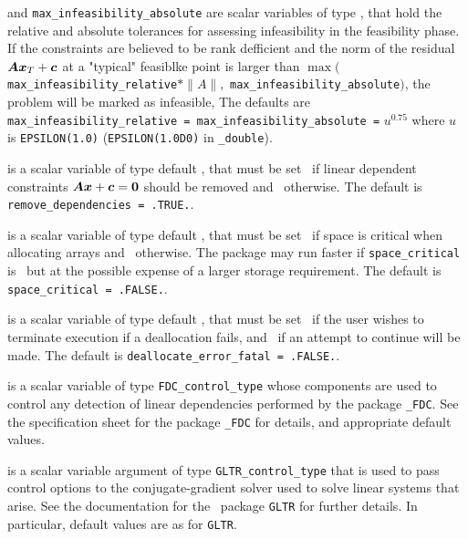 \begin{description}
 and {\tt max\_infeasibility\_absolute} 
are scalar variables of type \realdp, 
that hold the relative and absolute tolerances for assessing 
infeasibility in the feasibility phase.  If the constraints are believed to be 
rank defficient and the norm of the residual ${\bm{A}} {\bm{x}}_T + {\bm{c}}$
at a "typical" feasiblke point is larger than
  $\max( ${\tt max\_infeasibility\_relative}$ \ast \| A\|,$ 
{\tt max\_infeasibility\_absolute}$)$,
the problem will be marked as infeasible,
The defaults are 
{\tt max\_infeasibility\_relative = 
\tt max\_infeasibility\_absolute =} $u^{0.75}$
where $u$ is {\tt EPSILON(1.0)} ({\tt EPSILON(1.0D0)} in 
{\tt \fullpackagename\_double}).

 is a scalar variable of type default \logical, 
that must be set \true\ if linear dependent constraints
${\bm{A}} {\bm{x}} + {\bm{c}} = {\bm{0}}$ should be removed and \false\ otherwise.
The default is {\tt remove\_dependencies = .TRUE.}.


 is a scalar variable of type default \logical, 
that must be set \true\ if space is critical when allocating arrays
and  \false\ otherwise. The package may run faster if 
{\tt space\_critical} is \false\ but at the possible expense of a larger
storage requirement. The default is {\tt space\_critical = .FALSE.}.

 is a scalar variable of type default \logical, 
that must be set \true\ if the user wishes to terminate execution if
a deallocation  fails, and \false\ if an attempt to continue
will be made. The default is {\tt deallocate\_error\_fatal = .FALSE.}.

 is a scalar variable of type 
{\tt FDC\_control\_type}
whose components are used to control any detection of linear dependencies
performed by the package 
{\tt \libraryname\_FDC}. 
See the specification sheet for the package 
{\tt \libraryname\_FDC} 
for details, and appropriate default values.

 is a scalar variable argument of type 
{\tt GLTR\_control\_type} that is used to pass control
options to the conjugate-gradient solver used to solve linear systems that arise. 
See the documentation for the \galahad\ package {\tt GLTR} for further details. 
In particular, default values are as for {\tt GLTR}.


\end{description}
